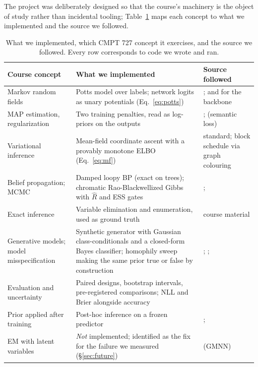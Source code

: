 \documentclass{article}
\begin{document}
The project was deliberately designed so that the course's machinery is the object of study
rather than incidental tooling; Table~\ref{tab:concepts} maps each concept to what we implemented
and the source we followed.

\begin{table}[t]
\caption{What we implemented, which CMPT 727 concept it exercises, and the source we followed.
Every row corresponds to code we wrote and ran.}
\label{tab:concepts}
\begin{center}
\small
\begin{tabular}{p{2.95cm}p{4.4cm}p{4.75cm}}
\toprule
\textbf{Course concept} & \textbf{What we implemented} & \textbf{Source followed} \\
\midrule
Markov random fields & Potts model over labels; network logits as unary potentials
(Eq.~\ref{eq:potts}) & \citet{zhu2003semi}; \citet{kipf2017semi} and \citet{li2018deeper}
for the backbone \\
MAP estimation, regularization & Two training penalties, read as log-priors on the outputs
& \citet{hu2016harnessing}; \citet{xu2018semantic} (semantic loss) \\
Variational inference & Mean-field coordinate ascent with a provably monotone ELBO
(Eq.~\ref{eq:mf}) & standard; block schedule via graph colouring \\
Belief propagation; MCMC & Damped loopy BP (exact on trees); chromatic Rao-Blackwellized Gibbs
with $\hat{R}$ and ESS gates & \citet{murphy1999loopy}; \citet{gonzalez2011parallel} \\
Exact inference & Variable elimination and enumeration, used as ground truth
& course material \\
Generative models; model misspecification & Synthetic generator with Gaussian
class-conditionals and a closed-form Bayes classifier; homophily sweep making the same prior true
or false by construction & \citet{deshpande2018contextual}; \citet{ma2022homophily};
\citet{platonov2023characterizing} \\
Evaluation and uncertainty & Paired designs, bootstrap intervals, pre-registered comparisons;
NLL and Brier alongside accuracy & \citet{shchur2018pitfalls} \\
Prior applied after training & Post-hoc inference on a frozen predictor
& \citet{gasteiger2019predict}; \citet{huang2021combining} \\
EM with latent variables & \emph{Not} implemented; identified as the fix for the failure we
measured (\S\ref{sec:future}) & \citet{qu2019gmnn} (GMNN) \\
\bottomrule
\end{tabular}
\end{center}
\end{table}
\end{document}
